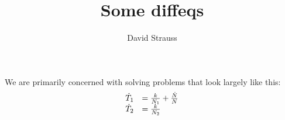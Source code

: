\documentclass{article}
\title{Some diffeqs}
\author{David Strauss}
\begin{document}
We are primarily concerned with solving problems that look largely like this:
\begin{equation}
\begin{array}{r l}
\dot{T}_1 & = \frac{k}{N_1} + \frac{\dot{N}}{N}\\
\dot{T}_2 & = \frac{k}{N_2}
\end{array}
\end{equation}
\end{document}
